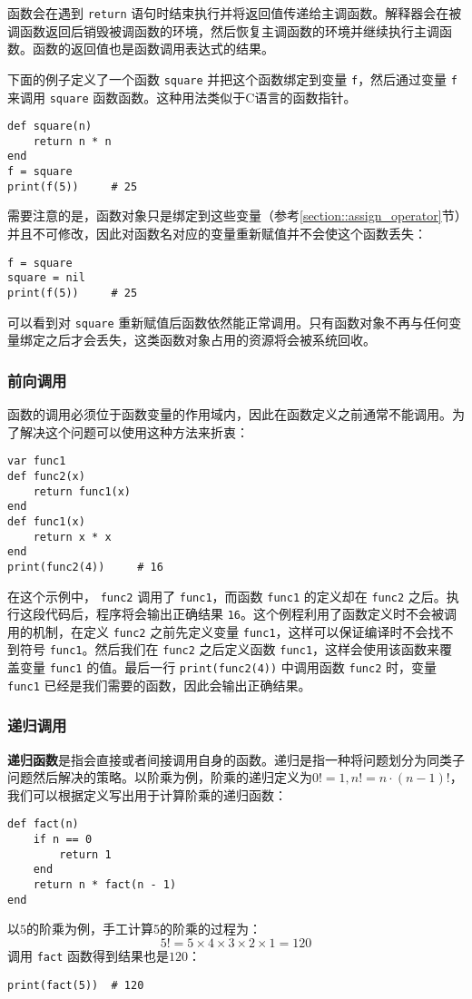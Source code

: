 函数会在遇到 \texttt{return} 语句时结束执行并将返回值传递给主调函数。解释器会在被调函数返回后销毁被调函数的环境，然后恢复主调函数的环境并继续执行主调函数。函数的返回值也是函数调用表达式的结果。

下面的例子定义了一个函数 \texttt{square} 并把这个函数绑定到变量 \texttt{f}，然后通过变量 \texttt{f} 来调用 \texttt{square} 函数函数。这种用法类似于C语言的函数指针。
\begin{lstlisting}[language=berry, numbers=none]
def square(n)
    return n * n
end
f = square
print(f(5))     # 25
\end{lstlisting}
需要注意的是，函数对象只是绑定到这些变量（参考\ref{section::assign_operator}节）并且不可修改，因此对函数名对应的变量重新赋值并不会使这个函数丢失：
\begin{lstlisting}[language=berry, numbers=none]
f = square
square = nil
print(f(5))     # 25
\end{lstlisting}
可以看到对 \texttt{square} 重新赋值后函数依然能正常调用。只有函数对象不再与任何变量绑定之后才会丢失，这类函数对象占用的资源将会被系统回收。

\subsubsection{前向调用}

函数的调用必须位于函数变量的作用域内，因此在函数定义之前通常不能调用。为了解决这个问题可以使用这种方法来折衷：
\begin{lstlisting}[language=berry]
var func1
def func2(x)
    return func1(x)
end
def func1(x)
    return x * x
end
print(func2(4))     # 16
\end{lstlisting}
在这个示例中， \texttt{func2} 调用了 \texttt{func1}，而函数 \texttt{func1} 的定义却在 \texttt{func2} 之后。执行这段代码后，程序将会输出正确结果 \texttt{16}。这个例程利用了函数定义时不会被调用的机制，在定义 \texttt{func2} 之前先定义变量 \texttt{func1}，这样可以保证编译时不会找不到符号 \texttt{func1}。然后我们在 \texttt{func2} 之后定义函数 \texttt{func1}，这样会使用该函数来覆盖变量 \texttt{func1} 的值。最后一行 \texttt{print(func2(4))} 中调用函数 \texttt{func2} 时，变量 \texttt{func1} 已经是我们需要的函数，因此会输出正确结果。

\subsubsection{递归调用}

\textbf{递归函数}是指会直接或者间接调用自身的函数。递归是指一种将问题划分为同类子问题然后解决的策略。以阶乘为例，阶乘的递归定义为$0!=1, n!=n\cdot(n-1)!$，我们可以根据定义写出用于计算阶乘的递归函数：
\begin{lstlisting}[language=berry]
def fact(n)
    if n == 0
        return 1
    end
    return n * fact(n - 1)
end
\end{lstlisting}
以$5$的阶乘为例，手工计算5的阶乘的过程为：
\begin{equation*}
5! = 5 \times 4 \times 3 \times 2 \times 1 = 120
\end{equation*}
调用 \texttt{fact} 函数得到结果也是$120$：
\begin{lstlisting}[language=berry, numbers=none]
print(fact(5))  # 120
\end{lstlisting}

